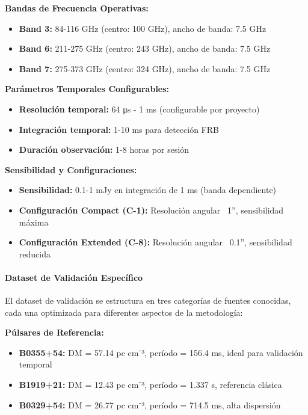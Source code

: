 \textbf{Bandas de Frecuencia Operativas:}
\begin{itemize}
\item \textbf{Band 3:} 84-116 GHz (centro: 100 GHz), ancho de banda: 7.5 GHz
\item \textbf{Band 6:} 211-275 GHz (centro: 243 GHz), ancho de banda: 7.5 GHz  
\item \textbf{Band 7:} 275-373 GHz (centro: 324 GHz), ancho de banda: 7.5 GHz
\end{itemize}

\textbf{Parámetros Temporales Configurables:}
\begin{itemize}
\item \textbf{Resolución temporal:} 64 μs - 1 ms (configurable por proyecto)
\item \textbf{Integración temporal:} 1-10 ms para detección FRB
\item \textbf{Duración observación:} 1-8 horas por sesión
\end{itemize}

\textbf{Sensibilidad y Configuraciones:}
\begin{itemize}
\item \textbf{Sensibilidad:} 0.1-1 mJy en integración de 1 ms (banda dependiente)
\item \textbf{Configuración Compact (C-1):} Resolución angular ~1'', sensibilidad máxima
\item \textbf{Configuración Extended (C-8):} Resolución angular ~0.1'', sensibilidad reducida
\end{itemize}

\paragraph{Dataset de Validación Específico}

El dataset de validación se estructura en tres categorías de fuentes conocidas, cada una optimizada para diferentes aspectos de la metodología:

\textbf{Púlsares de Referencia:}
\begin{itemize}
\item \textbf{B0355+54:} DM = 57.14 pc cm⁻³, período = 156.4 ms, ideal para validación temporal
\item \textbf{B1919+21:} DM = 12.43 pc cm⁻³, período = 1.337 s, referencia clásica
\item \textbf{B0329+54:} DM = 26.77 pc cm⁻³, período = 714.5 ms, alta dispersión
\end{itemize}

